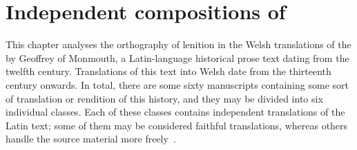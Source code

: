 \chapter{Independent compositions of }
\label{cha:indep-comp-mwbr}
This chapter analyses the orthography of lenition in the Welsh translations of the   by Geoffrey of Monmouth, a Latin-language historical prose text dating from the twelfth century.
Translations of this text into Welsh date from the thirteenth century onwards.
In total, there are some sixty manuscripts containing some sort of translation or rendition of this history, and they may be divided into six individual classes.
Each of these classes contains independent translations of the Latin text; some of them may be considered faithful translations, whereas others handle the source material more freely~\autocite[xxiv-xxxi]{roberts_brut_1971}.

